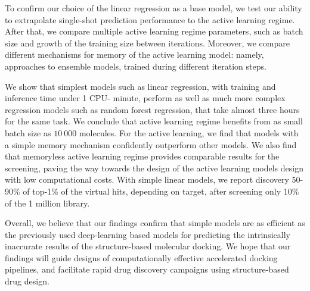 To confirm our choice of the linear regression as a base model, we test our ability to extrapolate single-shot prediction performance to the active learning regime. After that, we compare multiple active learning regime parameters, such as batch size and growth of the training size between iterations. Moreover, we compare different mechanisms for memory of the active learning model: namely, approaches to ensemble models, trained during different iteration steps.

We show that simplest models such as linear regression, with training and inference time under 1 CPU- minute, perform as well as much more complex regression models such as random forest regression, that take almost three hours for the same task. We conclude that active learning regime benefits from as small batch size as $10\ 000$ molecules. For the active learning, we find that models with a simple memory mechanism confidently outperform other models. We also find that memoryless active learning regime provides comparable results for the screening, paving the way towards the design of the active learning models design with low computational costs. With simple linear models, we report discovery 50-90\% of top-1\% of the virtual hits, depending on target, after screening only 10\% of the 1 million library.
 
Overall, we believe that our findings confirm that simple models are as efficient as the previously used deep-learning based models for predicting the intrinsically inaccurate results of the structure-based molecular docking. We hope that our findings will guide designs of computationally effective accelerated docking pipelines, and facilitate rapid drug discovery campaigns using structure-based drug design.
